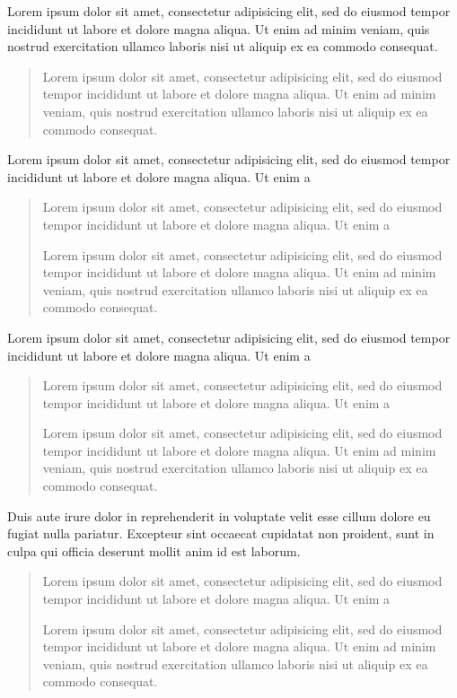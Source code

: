 \documentclass{article}
\begin{document}
    Lorem ipsum dolor sit amet, consectetur adipisicing elit, sed do eiusmod tempor incididunt ut labore et dolore magna aliqua. Ut enim ad minim veniam, quis nostrud exercitation ullamco laboris nisi ut aliquip ex ea commodo consequat.  
    \begin{quotation}
        Lorem ipsum dolor sit amet, consectetur adipisicing elit, sed do eiusmod tempor incididunt ut labore et dolore magna aliqua. Ut enim ad minim veniam, quis nostrud exercitation ullamco laboris nisi ut aliquip ex ea commodo consequat. 
    \end{quotation}
      Lorem ipsum dolor sit amet, consectetur adipisicing elit, sed do eiusmod tempor incididunt ut labore et dolore magna aliqua. Ut enim a
    
    \begin{quote}
    
    Lorem ipsum dolor sit amet, consectetur adipisicing elit, sed do eiusmod tempor incididunt ut labore et dolore magna aliqua. Ut enim a
    
  Lorem ipsum dolor sit amet, consectetur adipisicing elit, sed do eiusmod tempor incididunt ut labore et dolore magna aliqua. Ut enim ad minim veniam, quis nostrud exercitation ullamco laboris nisi ut aliquip ex ea commodo consequat. 
    \end{quote}
\begingroup
  \beginnumbering
	
    \pstart
    \lipsum[1]
    \pend
	

    \pstart
    Lorem ipsum dolor sit amet, consectetur adipisicing elit, sed do eiusmod tempor incididunt ut labore et dolore magna aliqua. Ut enim a
    \begin{quotation}
    Lorem ipsum dolor sit amet, consectetur adipisicing elit, sed do eiusmod tempor incididunt ut labore et dolore magna aliqua. Ut enim a
    
  Lorem ipsum dolor sit amet, consectetur adipisicing elit, sed do eiusmod tempor incididunt ut labore et dolore magna aliqua. Ut enim ad minim veniam, quis nostrud exercitation ullamco laboris nisi ut aliquip ex ea commodo consequat. 
    \end{quotation}
  
  
   Duis aute irure dolor in reprehenderit in voluptate velit esse cillum dolore eu fugiat nulla pariatur. Excepteur sint occaecat cupidatat non proident, sunt in culpa qui officia deserunt mollit anim id est laborum.
    
     \begin{quote} 
    Lorem ipsum dolor sit amet, consectetur adipisicing elit, sed do eiusmod tempor incididunt ut labore et dolore magna aliqua. Ut enim a
    
  Lorem ipsum dolor sit amet, consectetur adipisicing elit, sed do eiusmod tempor incididunt ut labore et dolore magna aliqua. Ut enim ad minim veniam, quis nostrud exercitation ullamco laboris nisi ut aliquip ex ea commodo consequat. 
    \end{quote}
    \leavevmode\skipnumbering
    
    \pend
    \pstart
    \lipsum[3]
    \pend

  \endnumbering
\endgroup
\end{document}
